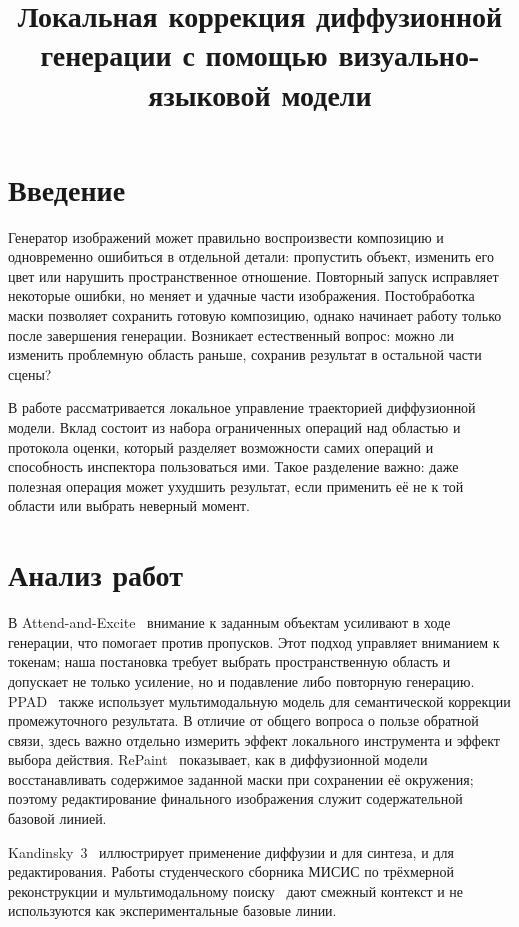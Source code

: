 \documentclass{misisarticle}
\title{Локальная коррекция диффузионной генерации с помощью визуально-языковой модели}
\begin{document}
\maketitle

\section{Введение}
Генератор изображений может правильно воспроизвести композицию и одновременно ошибиться в отдельной детали: пропустить объект, изменить его цвет или нарушить пространственное отношение. Повторный запуск исправляет некоторые ошибки, но меняет и удачные части изображения. Постобработка маски позволяет сохранить готовую композицию, однако начинает работу только после завершения генерации. Возникает естественный вопрос: можно ли изменить проблемную область раньше, сохранив результат в остальной части сцены?

В работе рассматривается локальное управление траекторией диффузионной модели. Вклад состоит из набора ограниченных операций над областью и протокола оценки, который разделяет возможности самих операций и способность инспектора пользоваться ими. Такое разделение важно: даже полезная операция может ухудшить результат, если применить её не к той области или выбрать неверный момент.

\section{Анализ работ}
В Attend-and-Excite~\cite{attend} внимание к заданным объектам усиливают в ходе генерации, что помогает против пропусков. Этот подход управляет вниманием к токенам; наша постановка требует выбрать пространственную область и допускает не только усиление, но и подавление либо повторную генерацию. PPAD~\cite{ppad} также использует мультимодальную модель для семантической коррекции промежуточного результата. В отличие от общего вопроса о пользе обратной связи, здесь важно отдельно измерить эффект локального инструмента и эффект выбора действия. RePaint~\cite{repaint} показывает, как в диффузионной модели восстанавливать содержимое заданной маски при сохранении её окружения; поэтому редактирование финального изображения служит содержательной базовой линией.

Kandinsky~3~\cite{kandinsky} иллюстрирует применение диффузии и для синтеза, и для редактирования. Работы студенческого сборника МИСИС по трёхмерной реконструкции и мультимодальному поиску~\cite{misis3d,misislego} дают смежный контекст и не используются как экспериментальные базовые линии.
\end{document}
